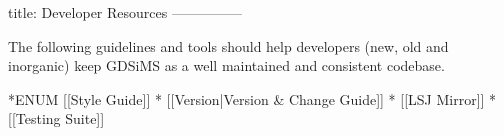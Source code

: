 title: Developer Resources
---------------

The following guidelines and tools should help developers (new, old and inorganic) keep GDSiMS as a well maintained and consistent codebase.

*ENUM [[Style Guide]]
	* [[Version|Version \& Change Guide]]
	* [[LSJ Mirror]]
	* [[Testing Suite]]
